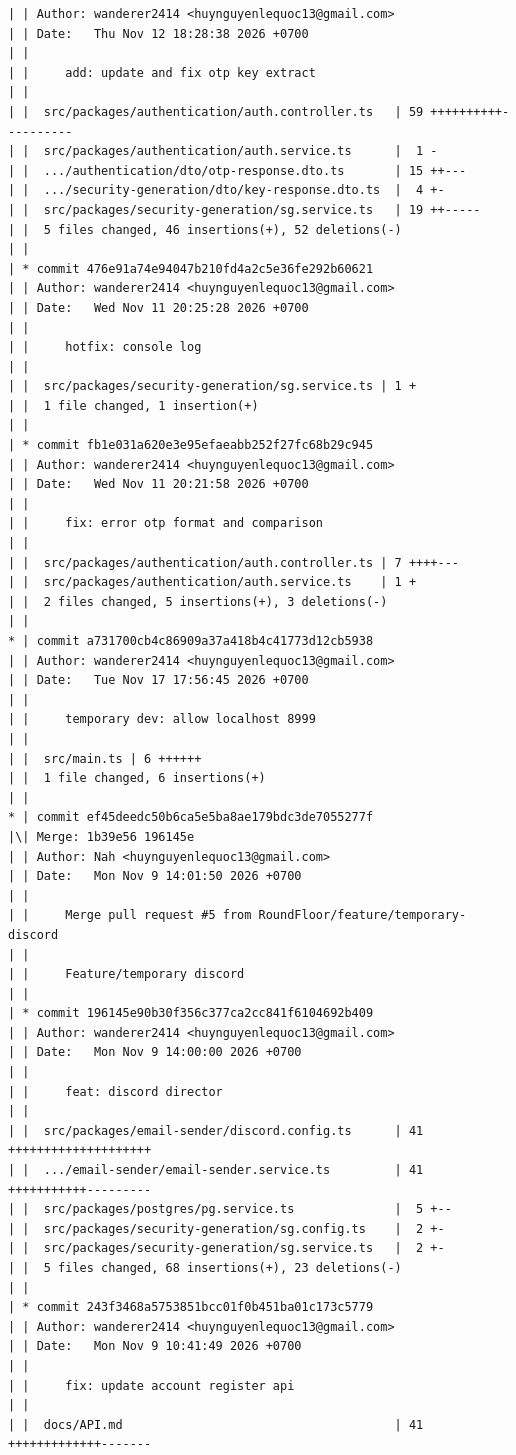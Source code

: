\documentclass[12pt]{article}
\begin{document}
\begin{lstlisting}[numbers=none,breaklines=true]
| | Author: wanderer2414 <huynguyenlequoc13@gmail.com>
| | Date:   Thu Nov 12 18:28:38 2026 +0700
| |
| |     add: update and fix otp key extract
| |
| |  src/packages/authentication/auth.controller.ts   | 59 ++++++++++----------
| |  src/packages/authentication/auth.service.ts      |  1 -
| |  .../authentication/dto/otp-response.dto.ts       | 15 ++---
| |  .../security-generation/dto/key-response.dto.ts  |  4 +-
| |  src/packages/security-generation/sg.service.ts   | 19 ++-----
| |  5 files changed, 46 insertions(+), 52 deletions(-)
| |
| * commit 476e91a74e94047b210fd4a2c5e36fe292b60621
| | Author: wanderer2414 <huynguyenlequoc13@gmail.com>
| | Date:   Wed Nov 11 20:25:28 2026 +0700
| |
| |     hotfix: console log
| |
| |  src/packages/security-generation/sg.service.ts | 1 +
| |  1 file changed, 1 insertion(+)
| |
| * commit fb1e031a620e3e95efaeabb252f27fc68b29c945
| | Author: wanderer2414 <huynguyenlequoc13@gmail.com>
| | Date:   Wed Nov 11 20:21:58 2026 +0700
| |
| |     fix: error otp format and comparison
| |
| |  src/packages/authentication/auth.controller.ts | 7 ++++---
| |  src/packages/authentication/auth.service.ts    | 1 +
| |  2 files changed, 5 insertions(+), 3 deletions(-)
| |
* | commit a731700cb4c86909a37a418b4c41773d12cb5938
| | Author: wanderer2414 <huynguyenlequoc13@gmail.com>
| | Date:   Tue Nov 17 17:56:45 2026 +0700
| |
| |     temporary dev: allow localhost 8999
| |
| |  src/main.ts | 6 ++++++
| |  1 file changed, 6 insertions(+)
| |
* | commit ef45deedc50b6ca5e5ba8ae179bdc3de7055277f
|\| Merge: 1b39e56 196145e
| | Author: Nah <huynguyenlequoc13@gmail.com>
| | Date:   Mon Nov 9 14:01:50 2026 +0700
| |
| |     Merge pull request #5 from RoundFloor/feature/temporary-discord
| |
| |     Feature/temporary discord
| |
| * commit 196145e90b30f356c377ca2cc841f6104692b409
| | Author: wanderer2414 <huynguyenlequoc13@gmail.com>
| | Date:   Mon Nov 9 14:00:00 2026 +0700
| |
| |     feat: discord director
| |
| |  src/packages/email-sender/discord.config.ts      | 41 ++++++++++++++++++++
| |  .../email-sender/email-sender.service.ts         | 41 +++++++++++---------
| |  src/packages/postgres/pg.service.ts              |  5 +--
| |  src/packages/security-generation/sg.config.ts    |  2 +-
| |  src/packages/security-generation/sg.service.ts   |  2 +-
| |  5 files changed, 68 insertions(+), 23 deletions(-)
| |
| * commit 243f3468a5753851bcc01f0b451ba01c173c5779
| | Author: wanderer2414 <huynguyenlequoc13@gmail.com>
| | Date:   Mon Nov 9 10:41:49 2026 +0700
| |
| |     fix: update account register api
| |
| |  docs/API.md                                      | 41 +++++++++++++-------

\end{lstlisting}
\end{document}
